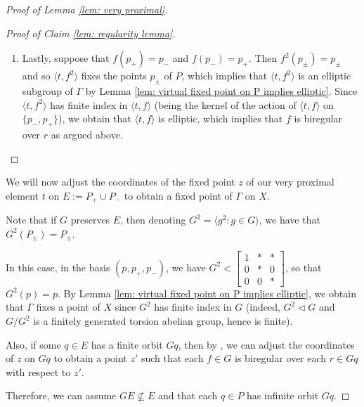 \documentclass[12pt]{article}
\theoremstyle{definition}
\begin{document}
\begin{proof} [Proof of Lemma \ref{lem: very proximal}]
\begin{proof}[Proof of Claim \ref{lem: regularity lemma}]
\begin{enumerate}
\begin{enumerate}
        
        \item Lastly, suppose that $f(p_+) = p_-$ and $f(p_-) = p_+$. Then $f^2(p_{\pm}) = p_{\pm}$ and so $\langle t,f^2 \rangle$ fixes the points $p_{\pm}$ of $P$, which implies that $\langle t,f^2 \rangle$ is an elliptic subgroup of $\Gamma$ by Lemma \ref{lem: virtual fixed point on P implies elliptic}. Since $\langle t,f^2 \rangle$ has finite index in $\langle t, f \rangle$ (being the kernel of the action of $\langle t, f \rangle$ on $\{p_-, p_+\}$), we obtain that $\langle t, f \rangle$ is elliptic, which implies that $f$ is biregular over $r$ as argued above. 
        
        \end{enumerate}
        \end{enumerate}
        \end{proof}

        We will now adjust the coordinates of the fixed point $z$ of our very proximal element $t$ on $E := P_+ \cup P_-$ to obtain a fixed point of $\Gamma$ on $X$. 

             Note that if $G$ preserves $E$, then denoting $G^2 = \langle g^2 : g \in G \rangle$, we have that $G^2 (P_\pm)  = P_\pm$. 

             In this case, in the basis $(p,p_+,p_-)$, we have $G^2 < \begin{bmatrix}
                    1 & * & * \\
                    0 & * & 0 \\
                    0 & 0 & *
                \end{bmatrix}$, so that $G^2(p) = p$. By Lemma \ref{lem: virtual fixed point on P implies elliptic}, we obtain that $\Gamma$ fixes a point of $X$ since $G^2$ has finite index in $G$ (indeed, $G^2 \triangleleft G$ and $G/G^2$ is a finitely generated torsion abelian group, hence is finite). 

            Also, if some $q \in E$ has a finite orbit $Gq$, then by \cite[Remark 4.2]{Algebraic}, we can adjust the coordinates of $z$ on $Gq$ to obtain a point $z'$ such that each $f \in G$ is biregular over each $r \in Gq$ with respect to $z'$. 

            Therefore, we can assume $GE \nsubseteq E$ and that each $q \in P$ has infinite orbit $Gq$. 


\end{proof}
\end{document}
